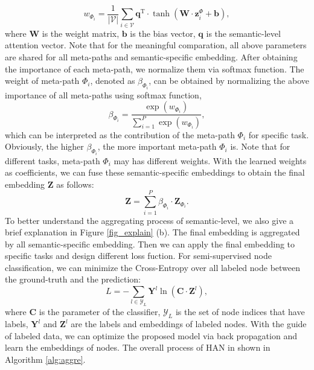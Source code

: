 \begin{equation}
w_{\Phi_i} =\frac{1}{|\mathcal{V}|}\sum_{i \in \mathcal{V}} \mathbf{q}^\mathrm{T} \cdot \tanh(\mathbf{W}\cdot \mathbf{z}_{i}^{\Phi}+\mathbf{b}),
\end{equation}
where $\mathbf{W}$ is the weight matrix,  $\mathbf{b}$ is the bias vector, $\mathbf{q}$ is the semantic-level attention vector. Note that for the meaningful comparation, all above parameters are shared for all meta-paths and semantic-specific embedding.
After obtaining the importance of each meta-path, we normalize them via softmax function. 
The weight of meta-path $\Phi_i$, denoted as  $\beta_{\Phi_i}$,  can be obtained by normalizing the above importance of all meta-paths using softmax function,
\begin{equation}
\beta_{\Phi_i}=\frac{\exp(w_{\Phi_i})}{\sum_{i=1}^{P} \exp(w_{\Phi_i})} ,
\end{equation}
which can be interpreted as the contribution of the meta-path $\Phi_i$ for specific task. Obviously, the higher $\beta_{\Phi_i}$, the more important meta-path $\Phi_i$ is. Note that for different tasks, meta-path $\Phi_i$ may has different weights.
With the learned weights as coefficients, 
we can fuse these semantic-specific embeddings to obtain the final embedding $\mathbf{Z}$ as follows:	
\begin{equation}
\mathbf{Z}=\sum_{i=1}^{P} \beta_{\Phi_i}\cdot \mathbf{Z}_{\Phi_i}.
\label{sem_agg}
\end{equation}
To better understand the aggregating process of semantic-level, we also give a brief explanation in Figure \ref{fig_explain} (b). The final embedding is aggregated by all semantic-specific embedding.
Then we can apply the final embedding to specific tasks and design different loss fuction. 
For semi-supervised node classification, we can minimize the Cross-Entropy over all labeled node between the ground-truth and the prediction:
\begin{equation}
L=-\sum_{l \in \mathcal{Y}_{L}} \mathbf{Y}^{l} \ln (\mathbf{C}\cdot \mathbf{Z}^{l}),
\end{equation}
where $\mathbf{C}$ is the parameter of the classifier,
$\mathcal{Y}_L$ is the set of node indices that have labels,
$\mathbf{Y}^{l}$ and $\mathbf{Z}^{l}$ are the labels and embeddings of labeled nodes.
With the guide of labeled data, we can optimize the proposed model via back propagation and learn the embeddings of nodes. The overall process of HAN in shown in Algorithm \ref{alg:aggre}.
